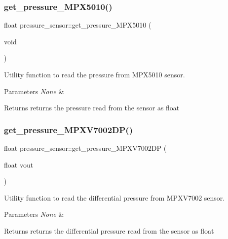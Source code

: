 \subsubsection{\texorpdfstring{get\+\_\+pressure\+\_\+\+M\+P\+X5010()}{get\_pressure\_MPX5010()}}
{\footnotesize\ttfamily float pressure\+\_\+sensor\+::get\+\_\+pressure\+\_\+\+M\+P\+X5010 (\begin{DoxyParamCaption}\item[{void}]{ }\end{DoxyParamCaption})\hspace{0.3cm}{\ttfamily [protected]}}



Utility function to read the pressure from M\+P\+X5010 sensor. 


\begin{DoxyParams}{Parameters}
{\em None} & \\
\hline
\end{DoxyParams}
\begin{DoxyReturn}{Returns}
returns the pressure read from the sensor as float 
\end{DoxyReturn}
\mbox{\label{group___ventilator_module_ga5eb61c5fdc62a4a0b494a518fc7273ba}} 
\subsubsection{\texorpdfstring{get\+\_\+pressure\+\_\+\+M\+P\+X\+V7002\+D\+P()}{get\_pressure\_MPXV7002DP()}}
{\footnotesize\ttfamily float pressure\+\_\+sensor\+::get\+\_\+pressure\+\_\+\+M\+P\+X\+V7002\+DP (\begin{DoxyParamCaption}\item[{float}]{vout }\end{DoxyParamCaption})\hspace{0.3cm}{\ttfamily [protected]}}



Utility function to read the differential pressure from M\+P\+X\+V7002 sensor. 


\begin{DoxyParams}{Parameters}
{\em None} & \\
\hline
\end{DoxyParams}
\begin{DoxyReturn}{Returns}
returns the differential pressure read from the sensor as float 
\end{DoxyReturn}
\mbox{\label{group___ventilator_module_gab51f616f215d3b4ade2bdd9a3958622d}} 
